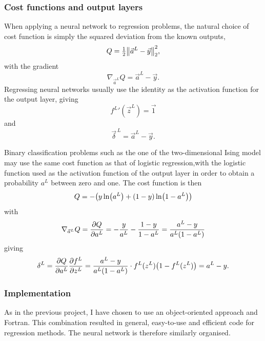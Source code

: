 \documentclass[11pt,british,a4paper]{article}
\numberwithin{equation}{section}
\begin{document}
\subsubsection{Cost functions and output layers}
When applying a neural network to regression problems, the natural choice of cost function is simply the squared deviation from the known outputs,
\begin{equation}
    Q = \tfrac{1}{2}\norm{\vec{a}^L - \vec{y}}_2^2,
\end{equation}
with the gradient
\begin{equation}
    \nabla_{\vec{a}^L} Q = \vec{a}^L - \vec{y}.
\end{equation}
Regressing neural networks usually use the identity as the activation function for the output layer, giving
\begin{equation}
    {f^L}'(\vec{z}^L) = \vec{1}
\end{equation}
and
\begin{equation}
    \vec{\delta}^{\,L} = \vec{a}^L - \vec{y}.
\end{equation}

Binary classification problems such as the one of the two-dimensional Ising model may use the same cost function as that of logistic regression,with the logistic function used as the activation function of the output layer in order to obtain a probability \(a^L\) between zero and one.
The cost function is then
\begin{equation}
    Q = -\qty(y\ln(a^L) + (1 - y)\ln(1-a^L))
\end{equation}
with
\begin{equation}
    \nabla_{\vec{a}^L} Q = \pdv{Q}{a^L} = -\frac{y}{a^L} - \frac{1-y}{1-a^L}
                         = \frac{a^L - y}{a^L\qty(1-a^L)}
\end{equation}
giving
\begin{equation}
    \delta^L = \pdv{Q}{a^L} \pdv{f^L}{z^L}
             = \frac{a^L - y}{a^L\qty(1-a^L)} \cdot f^L(z^L)\qty(1-f^L(z^L))
             = a^L - y.
\end{equation}

\subsubsection{Implementation}
As in the previous project, I have chosen to use an object-oriented approach and Fortran. This combination resulted in general, easy-to-use and efficient code for regression methods. The neural network is therefore similarly organised.
\end{document}
